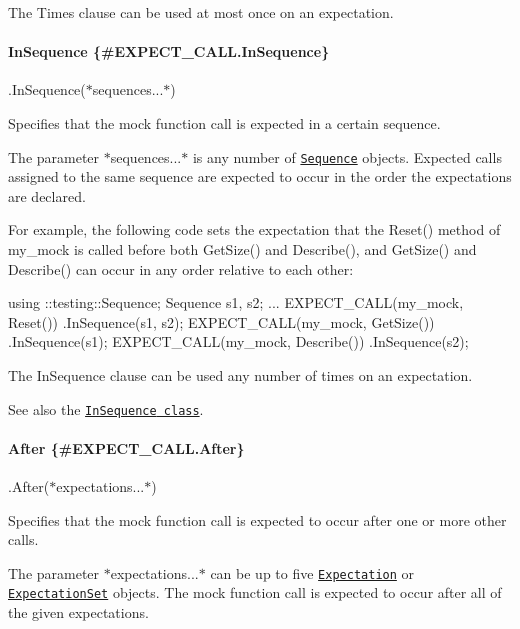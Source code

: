 The {\ttfamily Times} clause can be used at most once on an expectation.

\paragraph*{In\+Sequence \{\#\+E\+X\+P\+E\+C\+T\+\_\+\+C\+A\+L\+L.\+In\+Sequence\}}

{\ttfamily .In\+Sequence(}$\ast${\ttfamily sequences...}$\ast${\ttfamily )}

Specifies that the mock function call is expected in a certain sequence.

The parameter $\ast${\ttfamily sequences...}$\ast$ is any number of \href{#Sequence}{\tt {\ttfamily Sequence}} objects. Expected calls assigned to the same sequence are expected to occur in the order the expectations are declared.

For example, the following code sets the expectation that the {\ttfamily Reset()} method of {\ttfamily my\+\_\+mock} is called before both {\ttfamily Get\+Size()} and {\ttfamily Describe()}, and {\ttfamily Get\+Size()} and {\ttfamily Describe()} can occur in any order relative to each other\+:


\begin{DoxyCode}
using ::testing::Sequence;
Sequence s1, s2;
...
EXPECT\_CALL(my\_mock, Reset())
    .InSequence(s1, s2);
EXPECT\_CALL(my\_mock, GetSize())
    .InSequence(s1);
EXPECT\_CALL(my\_mock, Describe())
    .InSequence(s2);
\end{DoxyCode}


The {\ttfamily In\+Sequence} clause can be used any number of times on an expectation.

See also the \href{#InSequence}{\tt {\ttfamily In\+Sequence} class}.

\paragraph*{After \{\#\+E\+X\+P\+E\+C\+T\+\_\+\+C\+A\+L\+L.\+After\}}

{\ttfamily .After(}$\ast${\ttfamily expectations...}$\ast${\ttfamily )}

Specifies that the mock function call is expected to occur after one or more other calls.

The parameter $\ast${\ttfamily expectations...}$\ast$ can be up to five \href{#Expectation}{\tt {\ttfamily Expectation}} or \href{#ExpectationSet}{\tt {\ttfamily Expectation\+Set}} objects. The mock function call is expected to occur after all of the given expectations.

